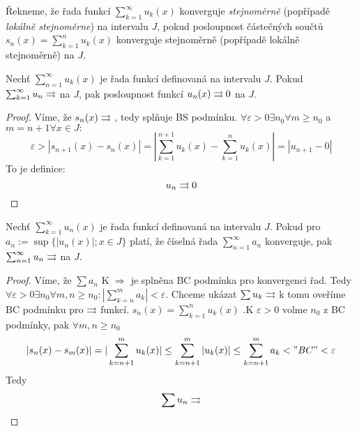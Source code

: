 \begin{definice}
Řekneme, že řada funkcí $\sum_{k=1}^{\infty} u_k (x)$ konverguje \emph{stejnoměrně} (popřípadě \emph{lokálně stejnoměrne}) na intervalu $J$, pokud posloupnost částečných součtů $s_n(x) = \sum_{k=1}^{n} u_k (x)$ konverguje stejnoměrně (popřípadě lokálně stejnoměrně) na $J$.
\end{definice}

\begin{vetal}
Nechť $\sum_{n=1}^{\infty} u_k (x)$ je řada funkcí definovaná na intervalu $J$. Pokud $\sum_{k=1}^{\infty} u_n \rightrightarrows$ na $J$, pak posloupnost funkcí $u_n (x) \rightrightarrows 0$ na $J$.
\end{vetal}
\begin{proof}
Víme, že $s_n(x) \rightrightarrows $ , tedy splňuje BS podmínku. 
$\forall \varepsilon > 0 \exists n_0  \forall m \geq n_0$ a $ m = n+1 \forall x \in J :$
$$\varepsilon > |s_{n+1}(x) - s_n(x)| = |\sum_{k=1}^{n+1} u_k(x) - \sum_{k=1}^{n}u_k(x)| = |u_{n+1} - 0|$$
To je definice: $$ u_n \rightrightarrows 0$$
\end{proof}

\begin{vetal}
Nechť $\sum_{k=1}^{\infty} u_n (x)$ je řada funkcí definovaná na intervalu $J$. Pokud pro $a_n := \sup \{ | u_n (x) |; x \in J \}$ platí, že číselná řada $\sum_{n=1}^{\infty} a_n$ konverguje, pak $\sum_{n=1}^{\infty} u_n \rightrightarrows$ na $J$.
\end{vetal}
\begin{proof}
Víme, že $\sum a_n $ K $\Rightarrow $ je splněna BC podmínka pro konvergenci řad.
Tedy $\forall \varepsilon > 0 \exists n_0 \forall m,n \geq n_0 :|\sum_{k = n}^m a_k| < \varepsilon$. \newline
Chceme ukázat $\sum u_k \rightrightarrows$ k tomu oveříme BC podmínku pro $\rightrightarrows$ funkcí.\newline
$s_n(x) = \sum_{k=1}^n u_k(x)$ .K $\varepsilon > 0$ volme $n_0$ z BC podmínky, pak $\forall m,n \geq n_0$
$$ |s_n(x) - s_m(x)| = |\sum_{k=n+1}^m u_k(x)| \leq \sum_{k=n+1}^m |u_k(x)| \leq \sum_{k=n+1}^m a_k < "BC" < \varepsilon $$
Tedy $$\sum u_n \rightrightarrows $$
\end{proof}

